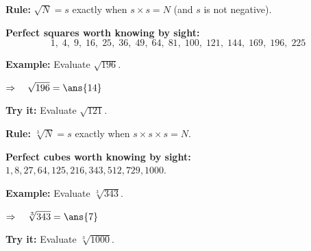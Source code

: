 \documentclass[12pt]{article}
\begin{document}


\begin{formulabox}
\textbf{Rule:} $\sqrt{N} = s$ exactly when $s \times s = N$ (and $s$ is not negative).
\par\smallskip
\textbf{Perfect squares worth knowing by sight:}
\[ 1,\; 4,\; 9,\; 16,\; 25,\; 36,\; 49,\; 64,\; 81,\; 100,\; 121,\; 144,\; 169,\; 196,\; 225 \]
\end{formulabox}

\begin{examplebox}
\textbf{Example:} \quad Evaluate $\sqrt{196}$.

$\Rightarrow\quad \sqrt{196} = \ans{14}$
\end{examplebox}

\begin{tryitbox}
\textbf{Try it:} \quad Evaluate $\sqrt{121}$.\\[2pt]
\end{tryitbox}


\begin{formulabox}
\textbf{Rule:} $\sqrt[3]{N} = s$ exactly when $s \times s \times s = N$.
\par\smallskip
\textbf{Perfect cubes worth knowing by sight:}
$1, 8, 27, 64, 125, 216, 343, 512, 729, 1000$.
\end{formulabox}

\begin{examplebox}
\textbf{Example:} \quad Evaluate $\sqrt[3]{343}$.

$\Rightarrow\quad \sqrt[3]{343} = \ans{7}$
\end{examplebox}

\begin{tryitbox}
\textbf{Try it:} \quad Evaluate $\sqrt[3]{1000}$.\\[2pt]
\end{tryitbox}
\end{document}
